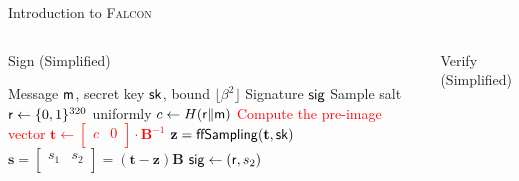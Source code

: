 %


\begin{frame}{Introduction to \textsc{Falcon}}

\begin{columns}[T]
\begin{block}{{\large Sign (Simplified)}}

\begin{algorithm}[H]
  \label{alg:falcon-sign}
  \begin{algorithmic}[1]
    \REQUIRE Message ${\sf m}$, secret key ${\sf sk}$, bound $\lfloor \beta^2 \rfloor$
    \ENSURE Signature ${\sf sig}$
    \STATE Sample salt ${\sf r} \gets \{0, 1\}^{320}$ uniformly
    \STATE $c \gets H({\sf r} \| {\sf m})$
    \STATE \textcolor<2>{red}{Compute the pre-image vector $\mathbf{t} \gets \left[
\begin{array}{c|c} c & 0 \\ \end{array} \right] \cdot \mathbf{B}^{-1}$}
    \REPEAT
        \STATE $\mathbf{z} = {\sf ffSampling}(\mathbf{t}, {\sf sk})$
        \STATE $\mathbf{s} = \left[ \begin{array}{c|c} s_1 & s_2 \\ \end{array} \right] = (\mathbf{t} - \textbf{z})\mathbf{B}$
    \STATE ${\sf sig} \gets ({\sf r}, s_2)$
  \end{algorithmic}
\end{algorithm}

\end{block}
\begin{block}{{\large Verify (Simplified)}}


\end{block}
\end{columns}
\end{frame}
